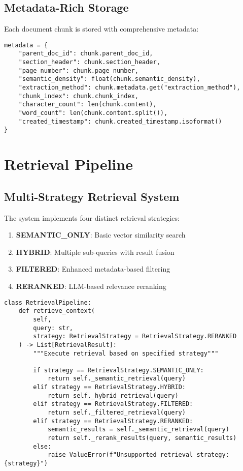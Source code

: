 \documentclass[10pt,a4paper,twocolumn]{article}
\begin{document}
\subsection{Metadata-Rich Storage}

Each document chunk is stored with comprehensive metadata:

\begin{lstlisting}[caption={Metadata Schema}]
metadata = {
    "parent_doc_id": chunk.parent_doc_id,
    "section_header": chunk.section_header,
    "page_number": chunk.page_number,
    "semantic_density": float(chunk.semantic_density),
    "extraction_method": chunk.metadata.get("extraction_method"),
    "chunk_index": chunk.chunk_index,
    "character_count": len(chunk.content),
    "word_count": len(chunk.content.split()),
    "created_timestamp": chunk.created_timestamp.isoformat()
}
\end{lstlisting}

\section{Retrieval Pipeline}

\subsection{Multi-Strategy Retrieval System}

The system implements four distinct retrieval strategies:

\begin{enumerate}
    \item \textbf{SEMANTIC\_ONLY}: Basic vector similarity search
    \item \textbf{HYBRID}: Multiple sub-queries with result fusion
    \item \textbf{FILTERED}: Enhanced metadata-based filtering
    \item \textbf{RERANKED}: LLM-based relevance reranking
\end{enumerate}

\begin{lstlisting}[caption={Retrieval Strategy Implementation}]
class RetrievalPipeline:
    def retrieve_context(
        self, 
        query: str, 
        strategy: RetrievalStrategy = RetrievalStrategy.RERANKED
    ) -> List[RetrievalResult]:
        """Execute retrieval based on specified strategy"""
        
        if strategy == RetrievalStrategy.SEMANTIC_ONLY:
            return self._semantic_retrieval(query)
        elif strategy == RetrievalStrategy.HYBRID:
            return self._hybrid_retrieval(query)
        elif strategy == RetrievalStrategy.FILTERED:
            return self._filtered_retrieval(query)
        elif strategy == RetrievalStrategy.RERANKED:
            semantic_results = self._semantic_retrieval(query)
            return self._rerank_results(query, semantic_results)
        else:
            raise ValueError(f"Unsupported retrieval strategy: {strategy}")
\end{lstlisting}
\end{document}
